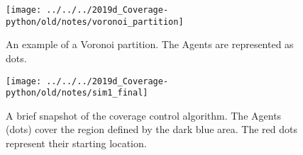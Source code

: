 \documentclass{article}
\begin{document}
\begin{figure}[H]
	\centering
	\texttt{[image: ../../../2019d\_Coverage-python/old/notes/voronoi\_partition]}
	\caption{An example of a Voronoi partition. The Agents are represented as dots.}
	\label{fig:voronoipartition}
\end{figure}
\begin{figure}[H]
	\centering
	\texttt{[image: ../../../2019d\_Coverage-python/old/notes/sim1\_final]}
	\caption{A brief snapshot of the coverage control algorithm. The Agents (dots) cover the region defined by the dark blue area. The red dots represent their starting location.}
	\label{fig:sim1final}
\end{figure}

\nocite{*}


\end{document}
